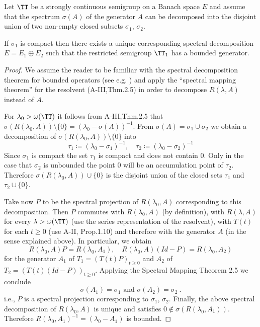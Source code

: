 \begin{theorem}\label{thm:a3-3.3}

Let $\TT$ be a strongly continuous semigroup on a Banach space $E$ and assume that the spectrum $\sigma(A)$ of the generator $A$ can be decomposed into the disjoint union of two non-empty closed subsets $\sigma_{1}$, $\sigma_{2}$.

If $\sigma_{1}$ is compact then there exists a unique corresponding spectral decomposition $E = E_{1} \oplus E_{2}$ such that the restricted semigroup $\TT_{1}$ has a bounded generator.
\end{theorem}

\begin{proof}
We assume the reader to be familiar with the spectral decomposition theorem for bounded operators (see e.g. \citet[p.572]{dunfordschwartz:1958}) and apply the \enquote{spectral mapping theorem} for the resolvent (A-III,Thm.2.5) in order to decompose $R(\lambda,A)$ instead of $A$.

For $\lambda_{0} > \omega(\TT)$ it follows from A-III,Thm.2.5 that $\sigma(R(\lambda_{0},A)) \setminus \{0\} = (\lambda_{0} - \sigma(A))^{-1}$.
From $\sigma(A) = \sigma_{1} \cup \sigma_{2}$ we obtain a decomposition of $\sigma(R(\lambda_{0},A)) \setminus \{0\}$ into
\[
\tau_{1} \coloneqq (\lambda_{0}-\sigma_{1})^{-1}, \quad \tau_{2} \coloneqq (\lambda_{0}-\sigma_{2})^{-1}
\]
Since $\sigma_{1}$ is compact the set $\tau_{1}$ is compact and does not contain $0$.
Only in the case that $\sigma_{2}$ is unbounded the point $0$ will be an accumulation point of $\tau_{2}$.
Therefore $\sigma(R(\lambda_{0},A)) \cup \{0\}$ is the disjoint union of the closed sets $\tau_{1}$ and $\tau_{2} \cup \{0\}$.

Take now $P$ to be the spectral projection of $R(\lambda_{0},A)$ corresponding to this decomposition.
Then $P$ commutes with $R(\lambda_{0},A)$ (by definition), with $R(\lambda,A)$ for every $\lambda > \omega(\TT)$ (use the series representation of the resolvent), with $T(t)$ for each $t \geq 0$ (use A-II, Prop.1.10) and therefore with the generator $A$ (in the sense explained above).
In particular, we obtain
\[
R(\lambda_{0},A)P = R(\lambda_{0},A_{1}), \quad R(\lambda_{0},A)(Id-P) = R(\lambda_{0},A_{2})
\]
for the generator $A_{1}$ of $T_{1} = (T(t)P)_{t \geq 0}$ and $A_{2}$ of $T_{2} = (T(t)(Id-P))_{t \geq 0}$.
Applying the Spectral Mapping Theorem 2.5 we conclude
\[
\sigma(A_{1}) = \sigma_{1} \text{ and } \sigma(A_{2}) = \sigma_{2}~.
\]
i.e., $P$ is a spectral projection corresponding to $\sigma_{1}$, $\sigma_{2}$.
Finally, the above spectral decomposition of $R(\lambda_{0},A)$ is unique and satisfies $0 \notin \sigma(R(\lambda_{0},A_{1}))$.
Therefore $R(\lambda_{0},A_{1})^{-1} = (\lambda_{0}-A_{1})$ is bounded.
\end{proof}



